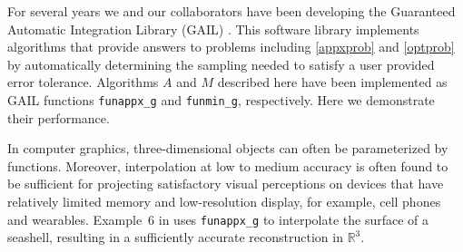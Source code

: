 \documentclass[review]{elsarticle}
\theoremstyle{definition}
\newcommand{\funappxg}{\texttt{funappx\_g}\xspace}
\newcommand{\funming}{\texttt{funmin\_g\xspace}}
\begin{document}
For several years we and our collaborators have been developing the Guaranteed Automatic Integration Library (GAIL) \cite{ChoEtal15a}.  This software library implements algorithms that provide answers to problems including \eqref{appxprob} and \eqref{optprob} by automatically determining the sampling needed to satisfy a user provided error tolerance. Algorithms $A$ and $M$ described here have been implemented as GAIL functions  \funappxg{} and \funming, respectively.  Here we demonstrate their performance.

In computer graphics, three-dimensional objects can often be parameterized by
functions. Moreover, interpolation at low to medium accuracy is often found to
be sufficient for projecting satisfactory visual perceptions on devices that
have relatively limited memory and low-resolution display, for example,
cell phones and wearables. Example~6 in \cite[Chapter~3, Section~6]{Din15a} uses \funappxg{} to
interpolate the surface of a seashell, resulting in a sufficiently accurate
reconstruction in $\mathbb{R}^3$.
\end{document}
